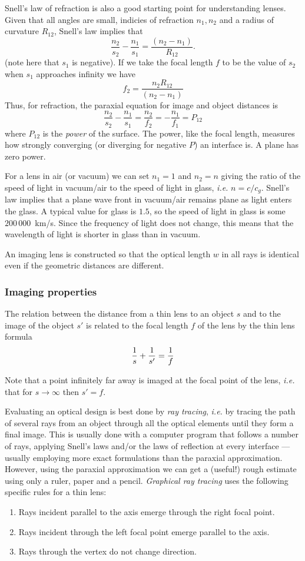 Snell's law of refraction is also a good starting point for
understanding lenses.
Given that all angles are small, indicies of refraction $n_1,n_2$ and
a radius of curvature $R_{12}$, Snell's law implies that
\[
\frac{n_2}{s_2}-\frac{n_1}{s_1}=\frac{(n_2-n_1)}{R_{12}}.
\]
(note here that $s_1$ is negative).
If we take the focal length $f$ to be the value of $s_2$ when $s_1$
approaches infinity we have
\[
f_2=\frac{n_2R_{12}}{(n_2-n_1)}
\]
Thus, for refraction, the paraxial equation for image and object
distances is
\[
\frac{n_2}{s_2}-\frac{n_1}{s_1}=\frac{n_2}{f_2}=-\frac{n_1}{f_1}=P_{12}
\]
where $P_{12}$ is the {\it power} of the surface. The power, like the
focal length, measures how strongly converging (or diverging for
negative $P$) an interface is. A plane has zero power.

For a lens in air (or vacuum) we can set $n_1=1$ and $n_2=n$ giving the ratio of the speed of light
in vacuum/air to the speed of light in glass, {\it i.e.} $n={c/c_g}$. Snell's 
law implies that a plane wave front in vacuum/air remains plane as light 
enters the glass. A typical value for glass is $1.5$, so the speed of light 
in glass is some $200\,000$~km/s. Since the frequency of light does not change,
this means that the wavelength of light is shorter in glass than in vacuum.

An imaging lens is constructed so that the optical length $w$ in all rays is 
identical even if the geometric distances are different. 

\subsubsection{Imaging properties}

The relation between the distance from a thin lens to an object $s$ and to the 
image of the object $s'$ is related to the focal length $f$ of the lens by the 
thin lens formula
\[
{1\over s}+{1\over s'}={1\over f}
\]

Note that a point infinitely far away is imaged at the focal point of the 
lens, {\it i.e.} that for $s\rightarrow\infty$ then $s'=f$. 

Evaluating an optical design is best done by {\it ray tracing}, {\it
  i.e.} by tracing the path of several rays from an object through all
the optical elements until they form a final image. This is usually
done with a computer program that follows a number of rays, applying
Snell's laws and/or the laws of reflection at every interface ---
usually employing more exact formulations than the paraxial
approximation. However, using the paraxial approximation we can get a
(useful!) rough estimate using only a ruler, paper and a pencil. {\it
  Graphical ray tracing} uses the following specific rules for a thin lens:
\begin{enumerate}
\item Rays incident parallel to the axis emerge through the right
  focal point.
\item Rays incident through the left focal point emerge parallel to the
  axis.
\item Rays through the vertex do not change direction.
\end{enumerate}

